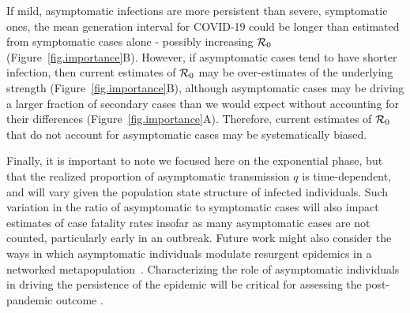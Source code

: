If mild, asymptomatic infections are more persistent than severe, symptomatic ones, the mean generation interval for COVID-19 could be longer than estimated from symptomatic cases alone - possibly increasing ${\cal{R}}_0$ (Figure~\ref{fig.importance}B).
However, if asymptomatic cases tend to have shorter infection, then current estimates of ${\cal{R}}_0$ may be over-estimates of the underlying strength (Figure~\ref{fig.importance}B), although asymptomatic cases may be driving a larger fraction of secondary cases than we would expect without accounting for their differences (Figure~\ref{fig.importance}A).
Therefore, current estimates of ${\cal{R}}_0$ that do not account for asymptomatic cases may be systematically biased.

Finally, it is important to note we focused here on the exponential phase, but that the realized proportion of asymptomatic transmission $q$ is time-dependent, and will vary given the population state structure of infected individuals. Such variation in the ratio of asymptomatic to symptomatic cases will also impact estimates of case fatality rates insofar as many asymptomatic cases are not counted, particularly early in an outbreak.
Future work might also consider the ways in which asymptomatic individuals modulate resurgent epidemics in a networked metapopulation~\citep{watts_pnas2005}.
Characterizing the role of asymptomatic individuals in driving the persistence of the epidemic will be critical for assessing the post-pandemic outcome \citep{lipsitch_preprint}.


